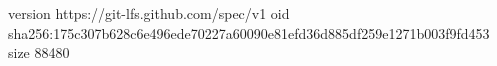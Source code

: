 version https://git-lfs.github.com/spec/v1
oid sha256:175c307b628c6e496ede70227a60090e81efd36d885df259e1271b003f9fd453
size 88480
